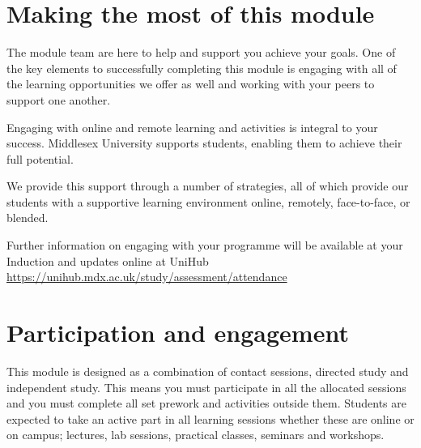 \documentclass{MDXHandbook}
\begin{document}





\section{Making the most of this module}

The module team are here to help and support you achieve your goals. One of the key elements to successfully completing this module is engaging with all of the learning opportunities we offer as well and working with your peers to support one another.

Engaging with online and remote learning and activities is integral to your success.  Middlesex University supports students, enabling them to achieve their full potential. 

We provide this support through a number of strategies, all of which provide our students with a supportive learning environment online, remotely, face-to-face, or blended.

Further information on engaging with your programme will be available at your Induction and updates online at UniHub
\url{https://unihub.mdx.ac.uk/study/assessment/attendance}


\section*{Participation and engagement}

This module is designed as a combination of contact sessions, directed study and independent study. This means you must participate in all the allocated sessions and you must complete all set prework and activities outside them. Students are expected to take an active part in all learning sessions whether these are online or on campus;  lectures, lab sessions, practical classes, seminars and workshops. 
\end{document}
